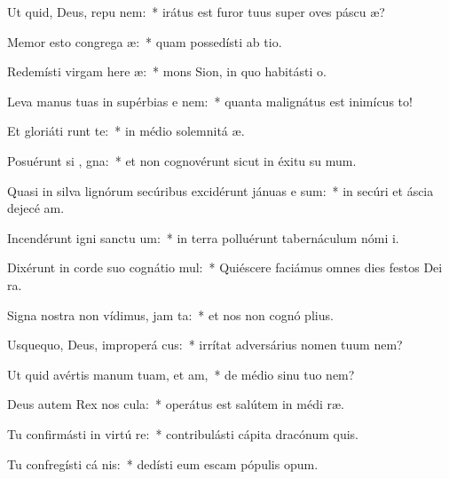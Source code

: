 \item Ut quid, Deus, repu  nem:~* irátus est furor tuus super oves páscu æ?
\item Memor esto congrega æ:~* quam possedísti ab tio.
\item Redemísti virgam here æ:~* mons Sion, in quo habitásti  o.
\item Leva manus tuas in supérbias e  nem:~* quanta malignátus est inimícus  to!
\item Et gloriáti   runt te:~* in médio solemnitá æ.
\item Posuérunt si , gna:~* et non cognovérunt sicut in éxitu su mum.
\item Quasi in silva lignórum secúribus excidérunt jánuas e  sum:~* in secúri et áscia dejecé am.
\item Incendérunt igni sanctu um:~* in terra polluérunt tabernáculum nómi i.
\item Dixérunt in corde suo cognátio  mul:~* Quiéscere faciámus omnes dies festos Dei  ra.
\item Signa nostra non vídimus, jam   ta:~* et nos non cognó plius.
\item Usquequo, Deus, improperá cus:~* irrítat adversárius nomen tuum  nem?
\item Ut quid avértis manum tuam, et  am,~* de médio sinu tuo  nem?
\item Deus autem Rex nos  cula:~* operátus est salútem in médi ræ.
\item Tu confirmásti in virtú  re:~* contribulásti cápita dracónum  quis.
\item Tu confregísti cá nis:~* dedísti eum escam pópulis opum.
